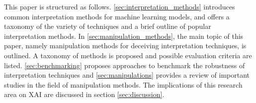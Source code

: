 This paper is structured as follows. \autoref{sec:interpretation_methods} introduces common interpretation methods for machine learning models, and offers a taxonomy of the variety of techniques and a brief outline of popular interpretation methods.
In \autoref{sec:manipulation_methods}, the main topic of this paper, namely manipulation methods for deceiving interpretation techniques, is outlined. A taxonomy of methods is proposed and possible evaluation criteria are listed. \autoref{sec:benchmarking} proposes approaches to benchmark the robustness of interpretation techniques and \autoref{sec:manipulations} provides a review of important studies in the field of manipulation methods. The implications of this research area on XAI are discussed in section \autoref{sec:discussion}.